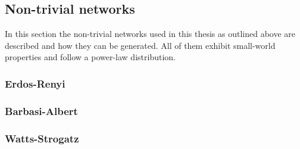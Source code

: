 \documentclass[../Bachelorarbeit.tex]{subfiles}
\begin{document}
\subsection{Non-trivial networks}
In this section the non-trivial networks used in this thesis as outlined above are described and how they can be generated. All of them exhibit small-world properties and follow a power-law distribution.

\subsubsection{Erdos-Renyi}
\subsubsection{Barbasi-Albert}
\subsubsection{Watts-Strogatz}
\end{document}
